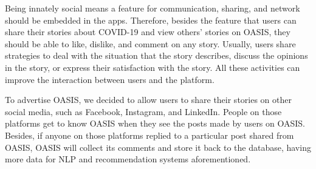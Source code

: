 \documentclass{ucsdreport}
\begin{document}
Being innately social means a feature for communication, sharing, and network 
should be embedded in the apps. Therefore, besides the feature that users 
can share their stories about COVID-19 and view others’ stories on OASIS,
they should be able to like, dislike, and comment on any story. Usually, 
users share strategies to deal with the situation that the story describes, 
discuss the opinions in the story, or express their satisfaction with the
story. All these activities can improve the interaction between users and
the platform. 

To advertise OASIS, we decided to allow users to share their stories on 
other social media, such as Facebook, Instagram, and LinkedIn. People on 
those platforms get to know OASIS when they see the posts made by users on
OASIS. Besides, if anyone on those platforms replied to a particular post 
shared from OASIS, OASIS will collect its comments and store it back to the 
database, having more data for NLP and recommendation systems aforementioned. 
\end{document}

